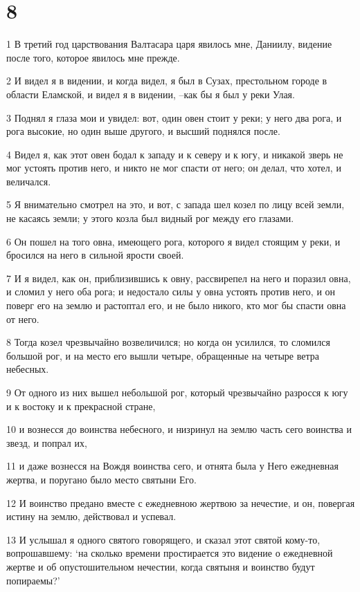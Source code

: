 \chapter{8}

\par 1 В третий год царствования Валтасара царя явилось мне, Даниилу, видение после того, которое явилось мне прежде.
\par 2 И видел я в видении, и когда видел, я был в Сузах, престольном городе в области Еламской, и видел я в видении, --как бы я был у реки Улая.
\par 3 Поднял я глаза мои и увидел: вот, один овен стоит у реки; у него два рога, и рога высокие, но один выше другого, и высший поднялся после.
\par 4 Видел я, как этот овен бодал к западу и к северу и к югу, и никакой зверь не мог устоять против него, и никто не мог спасти от него; он делал, что хотел, и величался.
\par 5 Я внимательно смотрел на это, и вот, с запада шел козел по лицу всей земли, не касаясь земли; у этого козла был видный рог между его глазами.
\par 6 Он пошел на того овна, имеющего рога, которого я видел стоящим у реки, и бросился на него в сильной ярости своей.
\par 7 И я видел, как он, приблизившись к овну, рассвирепел на него и поразил овна, и сломил у него оба рога; и недостало силы у овна устоять против него, и он поверг его на землю и растоптал его, и не было никого, кто мог бы спасти овна от него.
\par 8 Тогда козел чрезвычайно возвеличился; но когда он усилился, то сломился большой рог, и на место его вышли четыре, обращенные на четыре ветра небесных.
\par 9 От одного из них вышел небольшой рог, который чрезвычайно разросся к югу и к востоку и к прекрасной стране,
\par 10 и вознесся до воинства небесного, и низринул на землю часть сего воинства и звезд, и попрал их,
\par 11 и даже вознесся на Вождя воинства сего, и отнята была у Него ежедневная жертва, и поругано было место святыни Его.
\par 12 И воинство предано вместе с ежедневною жертвою за нечестие, и он, повергая истину на землю, действовал и успевал.
\par 13 И услышал я одного святого говорящего, и сказал этот святой кому-то, вопрошавшему: `на сколько времени простирается это видение о ежедневной жертве и об опустошительном нечестии, когда святыня и воинство будут попираемы?'
